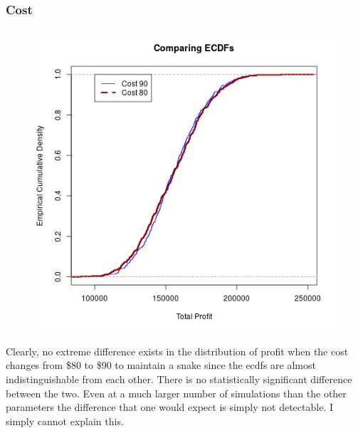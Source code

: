 \documentclass{article}
\begin{document}
		\subsubsection*{Cost}
\begin{figure}[H]
\centering
\includegraphics[width=.5\textwidth]{costECDF.png}
\end{figure}
\indent\indent Clearly, no extreme difference exists in the distribution of profit when the cost changes from \$80 to \$90 to maintain a snake since the ecdfs are almost indistinguishable from each other. There is no statistically significant difference between the two. Even at a much larger number of simulations than the other parameters the difference that one would expect is simply not detectable. I simply  cannot explain this.
\end{document}
